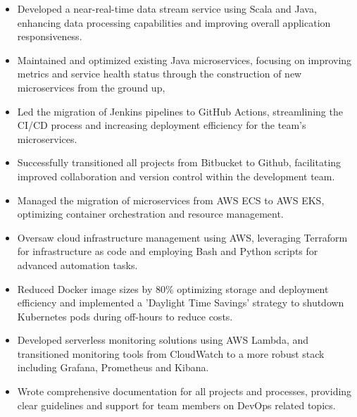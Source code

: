 \documentclass[10pt,a4paper,photo]{altacv}
\begin{document}
\begin{itemize}
\item Developed a near-real-time data stream service using Scala and Java, enhancing data processing capabilities and improving overall application responsiveness.
\item Maintained and optimized existing Java microservices, focusing on improving metrics and service health status through the construction of new microservices from the ground up,
\item Led the migration of Jenkins pipelines to GitHub Actions, streamlining the CI/CD process and increasing deployment efficiency for the team's microservices.
\item Successfully transitioned all projects from Bitbucket to Github, facilitating improved collaboration and version control within the development team.
\item Managed the migration of microservices from AWS ECS to AWS EKS, optimizing container orchestration and resource management.
\item Oversaw cloud infrastructure management using AWS, leveraging Terraform for infrastructure as code and employing Bash and Python scripts for advanced automation tasks.
\item Reduced Docker image sizes by 80\% optimizing storage and deployment efficiency and implemented a 'Daylight Time Savings' strategy to shutdown Kubernetes pods during off-hours to reduce costs.
\item Developed serverless monitoring solutions using AWS Lambda, and transitioned monitoring tools from CloudWatch to a more robust stack including Grafana, Prometheus and Kibana.
\item Wrote comprehensive documentation for all projects and processes, providing clear guidelines and support for team members on DevOps related topics.

\end{itemize}

\divider
\end{document}
